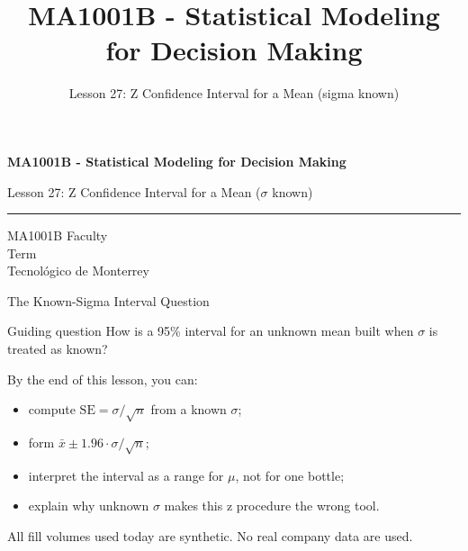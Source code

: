 \documentclass[aspectratio=169,10pt,english]{beamer}
\title{MA1001B - Statistical Modeling for Decision Making}
\subtitle{Lesson 27: Z Confidence Interval for a Mean (sigma known)}
\author{}
\institute{Tecnol\'ogico de Monterrey}
\date{}
\begin{document}
\begin{frame}[plain]
  \vspace{1.2cm}
  {\Large\bfseries MA1001B - Statistical Modeling for Decision Making\par}
  \vspace{0.7cm}
  {\large Lesson 27: Z Confidence Interval for a Mean ($\sigma$ known)\par}
  \vspace{0.7cm}
  {\color{TecRojo}\rule{\textwidth}{1.2pt}}
  \vspace{0.8cm}

  MA1001B Faculty\\[0.3cm]
  Term\\[0.3cm]
  Tecnol\'ogico de Monterrey
\end{frame}

\begin{frame}{The Known-Sigma Interval Question}
  \begin{alertblock}{Guiding question}
    How is a 95\% interval for an unknown mean built when $\sigma$ is treated
    as known?
  \end{alertblock}

  \vspace{0.6em}
  By the end of this lesson, you can:
  \begin{itemize}
    \item compute $\mathrm{SE}=\sigma/\sqrt{n}$ from a known $\sigma$;
    \item form $\bar{x}\pm 1.96\cdot\sigma/\sqrt{n}$;
    \item interpret the interval as a range for $\mu$, not for one bottle;
    \item explain why unknown $\sigma$ makes this z procedure the wrong tool.
  \end{itemize}

  \vfill
  \scriptsize All fill volumes used today are synthetic. No real company data are used.
\end{frame}
\end{document}
